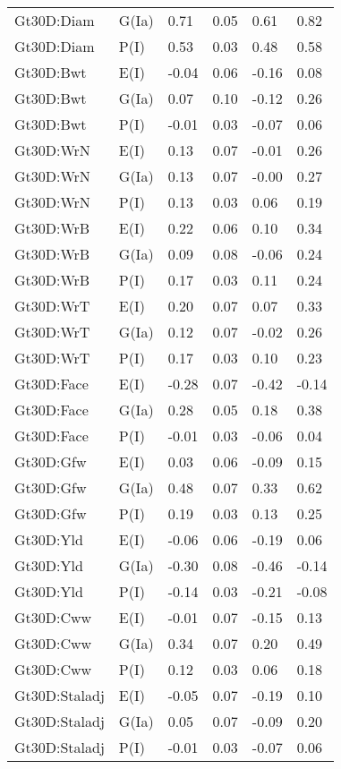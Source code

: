 \begin{center}
\begin{longtable}{|p{1.1in}|p{0.7in}|p{0.7in}|p{0.6in}|p{0.6in}|p{0.6in}|}
  Gt30D:Diam & G(Ia) & 0.71 & 0.05 & 0.61 & 0.82 \\ 
  Gt30D:Diam & P(I) & 0.53 & 0.03 & 0.48 & 0.58 \\ 
  Gt30D:Bwt & E(I) & -0.04 & 0.06 & -0.16 & 0.08 \\ 
  Gt30D:Bwt & G(Ia) & 0.07 & 0.10 & -0.12 & 0.26 \\ 
  Gt30D:Bwt & P(I) & -0.01 & 0.03 & -0.07 & 0.06 \\ 
  Gt30D:WrN & E(I) & 0.13 & 0.07 & -0.01 & 0.26 \\ 
  Gt30D:WrN & G(Ia) & 0.13 & 0.07 & -0.00 & 0.27 \\ 
  Gt30D:WrN & P(I) & 0.13 & 0.03 & 0.06 & 0.19 \\ 
  Gt30D:WrB & E(I) & 0.22 & 0.06 & 0.10 & 0.34 \\ 
  Gt30D:WrB & G(Ia) & 0.09 & 0.08 & -0.06 & 0.24 \\ 
  Gt30D:WrB & P(I) & 0.17 & 0.03 & 0.11 & 0.24 \\ 
  Gt30D:WrT & E(I) & 0.20 & 0.07 & 0.07 & 0.33 \\ 
  Gt30D:WrT & G(Ia) & 0.12 & 0.07 & -0.02 & 0.26 \\ 
  Gt30D:WrT & P(I) & 0.17 & 0.03 & 0.10 & 0.23 \\ 
  Gt30D:Face & E(I) & -0.28 & 0.07 & -0.42 & -0.14 \\ 
  Gt30D:Face & G(Ia) & 0.28 & 0.05 & 0.18 & 0.38 \\ 
  Gt30D:Face & P(I) & -0.01 & 0.03 & -0.06 & 0.04 \\ 
  Gt30D:Gfw & E(I) & 0.03 & 0.06 & -0.09 & 0.15 \\ 
  Gt30D:Gfw & G(Ia) & 0.48 & 0.07 & 0.33 & 0.62 \\ 
  Gt30D:Gfw & P(I) & 0.19 & 0.03 & 0.13 & 0.25 \\ 
  Gt30D:Yld & E(I) & -0.06 & 0.06 & -0.19 & 0.06 \\ 
  Gt30D:Yld & G(Ia) & -0.30 & 0.08 & -0.46 & -0.14 \\ 
  Gt30D:Yld & P(I) & -0.14 & 0.03 & -0.21 & -0.08 \\ 
  Gt30D:Cww & E(I) & -0.01 & 0.07 & -0.15 & 0.13 \\ 
  Gt30D:Cww & G(Ia) & 0.34 & 0.07 & 0.20 & 0.49 \\ 
  Gt30D:Cww & P(I) & 0.12 & 0.03 & 0.06 & 0.18 \\ 
  Gt30D:Staladj & E(I) & -0.05 & 0.07 & -0.19 & 0.10 \\ 
  Gt30D:Staladj & G(Ia) & 0.05 & 0.07 & -0.09 & 0.20 \\ 
  Gt30D:Staladj & P(I) & -0.01 & 0.03 & -0.07 & 0.06 \\ 

\end{longtable}
\end{center}
